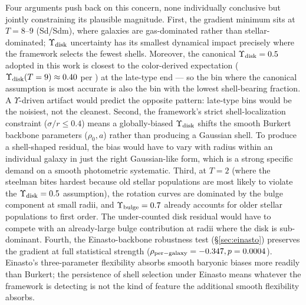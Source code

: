 \documentclass[linenumbers]{aastex701}
\newcommand{\Yt}{\Upsilon}
\newcommand{\Ydisk}{\Upsilon_{\rm disk}}
\newcommand{\Ybulge}{\Upsilon_{\rm bulge}}
\begin{document}
Four arguments push back on this concern, none individually conclusive but jointly constraining its plausible magnitude. First, the gradient minimum sits at $T=8$--$9$ (Sd/Sdm), where galaxies are gas-dominated rather than stellar-dominated; $\Ydisk$ uncertainty has its smallest dynamical impact precisely where the framework selects the fewest shells. Moreover, the canonical $\Ydisk = 0.5$ adopted in this work is closest to the color-derived expectation ($\Ydisk(T=9) \approx 0.40$ per \citealt{Schombert2022}) at the late-type end --- so the bin where the canonical assumption is most accurate is also the bin with the lowest shell-bearing fraction. A $\Yt$-driven artifact would predict the opposite pattern: late-type bins would be the noisiest, not the cleanest. Second, the framework's strict shell-localization constraint ($\sigma/r \le 0.4$) means a globally-biased $\Ydisk$ shifts the smooth Burkert backbone parameters ($\rho_0, a$) rather than producing a Gaussian shell. To produce a shell-shaped residual, the bias would have to vary with radius within an individual galaxy in just the right Gaussian-like form, which is a strong specific demand on a smooth photometric systematic. Third, at $T=2$ (where the steelman bites hardest because old stellar populations are most likely to violate the $\Ydisk = 0.5$ assumption), the rotation curves are dominated by the bulge component at small radii, and $\Ybulge = 0.7$ already accounts for older stellar populations to first order. The under-counted disk residual would have to compete with an already-large bulge contribution at radii where the disk is sub-dominant. Fourth, the Einasto-backbone robustness test (\S\ref{sec:einasto}) preserves the gradient at full statistical strength ($\rho_{\rm per-galaxy} = -0.347, p = 0.0004$). Einasto's three-parameter flexibility absorbs smooth baryonic biases more readily than Burkert; the persistence of shell selection under Einasto means whatever the framework is detecting is not the kind of feature the additional smooth flexibility absorbs.
\end{document}
